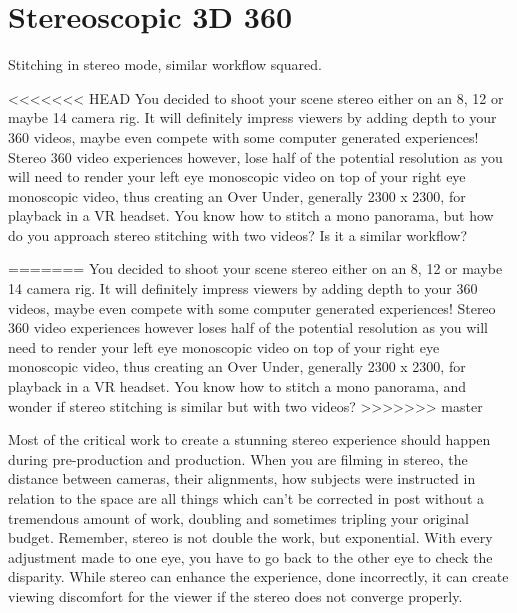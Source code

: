 \chapter{Stereoscopic 3D 360}
\pagecolor{white}
\label{chap:42}
\begin{fullwidth}

\problem

{\large Stitching in stereo mode, similar workflow squared. \par}

<<<<<<< HEAD
You decided to shoot your scene stereo either on an 8, 12 or maybe 14 camera rig. It will definitely impress viewers by adding depth to your 360 videos, maybe even compete with some computer generated experiences! Stereo 360 video experiences however, lose half of the potential resolution as you will need to render your left eye monoscopic video on top of your right eye monoscopic video, thus creating an Over Under, generally 2300 x 2300, for playback in a VR headset. You know how to stitch a mono panorama, but how do you approach stereo stitching with two videos? Is it a similar workflow?

=======
You decided to shoot your scene stereo either on an 8, 12 or maybe 14 camera rig. It will definitely impress viewers by adding depth to your 360 videos, maybe even compete with some computer generated experiences! Stereo 360 video experiences however loses half of the potential resolution as you will need to render your left eye monoscopic video on top of your right eye monoscopic video, thus creating an Over Under, generally 2300 x 2300, for playback in a VR headset. You know how to stitch a mono panorama, and wonder if stereo stitching is similar but with two videos?
>>>>>>> master

\solution

Most of the critical work to create a stunning stereo experience should happen during pre-production and production. When you are filming in stereo, the distance between cameras, their alignments, how subjects were instructed in relation to the space are all things which can’t be corrected in post without a tremendous amount of work, doubling and sometimes tripling your original budget. Remember, stereo is not double the work, but exponential. With every adjustment made to one eye, you have to go back to the other eye to check the disparity. While stereo can enhance the experience, done incorrectly, it can create viewing discomfort for the viewer if the stereo does not converge properly. 



\end{fullwidth}
